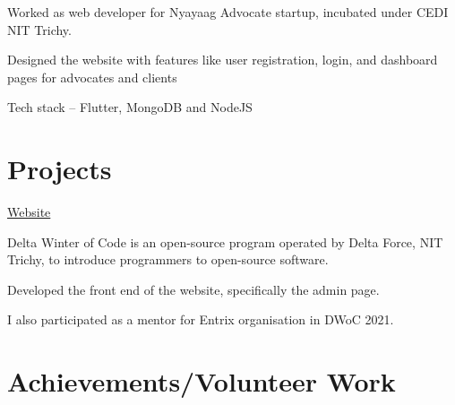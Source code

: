 \documentclass[]{deedy-resume-openfont}
\begin{document}
\begin{minipage}[t]{0.69\textwidth}
\hfill {}
\begin{tightemize}
    \item Worked as web developer for Nyayaag Advocate startup, incubated under CEDI NIT Trichy.
    \item Designed the website with features like user registration, login, and dashboard pages for advocates and clients
	\item Tech stack – Flutter, MongoDB and NodeJS
\end{tightemize}

\sectionsep

\section{Projects}
\raggedright

\hfill \href{http://dwoc.io}{Website}\\
\begin{tightemize}
    \item Delta Winter of Code is an open-source program operated by Delta Force, NIT Trichy, to introduce programmers to open-source software.
    \item Developed the front end of the website, specifically the admin page.
	\item  I also participated as a mentor for Entrix organisation in DWoC 2021.
\end{tightemize}
\sectionsep

\section{Achievements/Volunteer Work}

\

\

\

\



\sectionsep
\end{minipage} 
\end{document}

